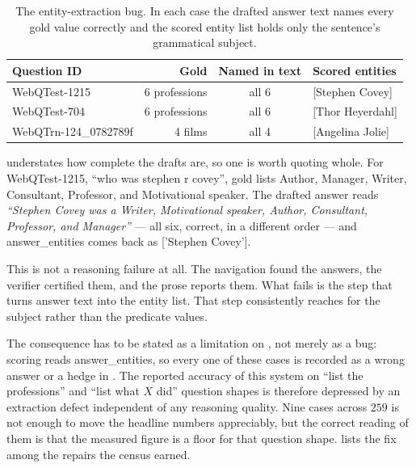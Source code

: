 \begin{table}[!tb]
  \begin{center}
    \caption[The entity-extraction bug]{The entity-extraction bug. In each case
    the drafted answer text names every gold value correctly and the scored
    entity list holds only the sentence's grammatical subject.}
    \label{tab:extraction}
    \small
    \begin{tabular}{|l|r|c|l|}
      \hline
      \textbf{Question ID} & \textbf{Gold} & \textbf{Named in text} &
      \textbf{Scored entities} \\
      \hline
      WebQTest-1215 & 6 professions & all 6 & \textsf{[Stephen Covey]} \\
      WebQTest-704  & 6 professions & all 6 & \textsf{[Thor Heyerdahl]} \\
      WebQTrn-124\_0782789f   & 4 films       & all 4 &
        \textsf{[Angelina Jolie]} \\
      \hline
    \end{tabular}
  \end{center}
\end{table}

 understates how complete the drafts are, so one is worth
quoting whole. For \textsf{WebQTest-1215}, ``who was stephen r covey'', gold
lists Author, Manager, Writer, Consultant, Professor, and Motivational speaker.
The drafted answer reads \emph{``Stephen Covey was a Writer, Motivational
speaker, Author, Consultant, Professor, and Manager''} --- all six, correct, in
a different order --- and \textsf{answer\_entities} comes back as
\textsf{['Stephen Covey']}.

This is not a reasoning failure at all. The navigation found the answers, the
verifier certified them, and the prose reports them. What fails is the step that
turns answer text into the entity list. That step consistently reaches for the
subject rather than the predicate values.

The consequence has to be stated as a limitation on , not
merely as a bug: scoring reads \textsf{answer\_entities}, so every one of these
cases is recorded as a wrong answer or a hedge in . The reported
accuracy of this system on ``list the professions'' and ``list what $X$ did''
question shapes is therefore depressed by an extraction defect independent of
any reasoning quality. Nine cases across $259$ is not enough to move the
headline numbers appreciably, but the correct reading of them is that the
measured figure is a floor for that question shape.  lists
the fix among the repairs the census earned.

